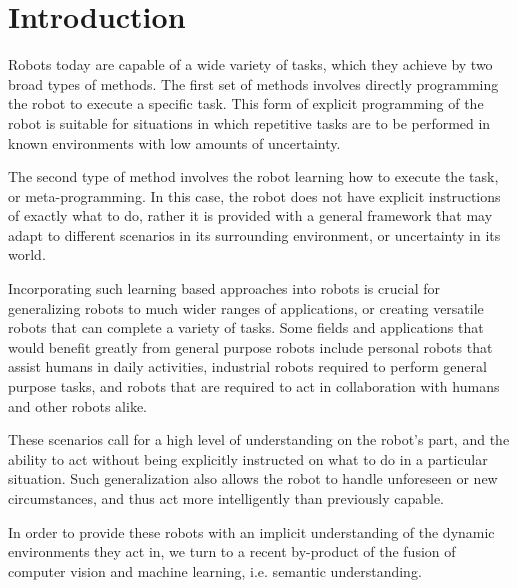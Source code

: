 \chapter{Introduction}

Robots today are capable of a wide variety of tasks, which they achieve by two broad types of methods. The first set of methods involves directly programming the robot to execute a specific task. This form of explicit programming of the robot is suitable for situations in which repetitive tasks are to be performed in known environments with low amounts of uncertainty. 

The second type of method involves the robot learning how to execute the task, or meta-programming. In this case, the robot does not have explicit instructions of exactly what to do, rather it is provided with a general framework that may adapt to different scenarios in its surrounding environment, or uncertainty in its world. 

Incorporating such learning based approaches into robots is crucial for generalizing robots to much wider ranges of applications, or creating versatile robots that can complete a variety of tasks. Some fields and applications that would benefit greatly from general purpose robots include personal robots that assist humans in daily activities, industrial robots required to perform general purpose tasks, and robots that are required to act in collaboration with humans and other robots alike. 

These scenarios call for a high level of understanding on the robot's part, and the ability to act without being explicitly instructed on what to do in a particular situation. Such generalization also allows the robot to handle unforeseen or new circumstances, and thus act more intelligently than previously capable. 

In order to provide these robots with an implicit understanding of the dynamic environments they act in, we turn to a recent by-product of the fusion of computer vision and machine learning, i.e. semantic understanding. 